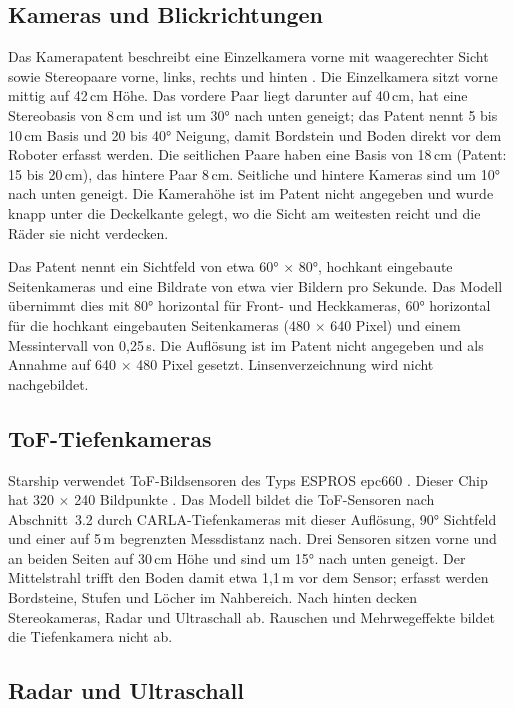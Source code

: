 \subsection{Kameras und Blickrichtungen}
\label{sec:starship_kameras}

Das Kamerapatent beschreibt eine Einzelkamera vorne mit waagerechter Sicht sowie
Stereopaare vorne, links, rechts und hinten \parencite{starship_patent_kamera}. Die
Einzelkamera sitzt vorne mittig auf 42\,cm Höhe. Das vordere Paar liegt darunter auf
40\,cm, hat eine Stereobasis von 8\,cm und ist um 30° nach unten geneigt; das Patent nennt
5 bis 10\,cm Basis und 20 bis 40° Neigung, damit Bordstein und Boden direkt vor dem
Roboter erfasst werden. Die seitlichen Paare haben eine Basis von 18\,cm (Patent: 15 bis
20\,cm), das hintere Paar 8\,cm. Seitliche und hintere Kameras sind um 10° nach unten
geneigt. Die Kamerahöhe ist im Patent nicht angegeben und wurde knapp unter die
Deckelkante gelegt, wo die Sicht am weitesten reicht und die Räder sie nicht verdecken.

Das Patent nennt ein Sichtfeld von etwa 60° $\times$ 80°, hochkant eingebaute
Seitenkameras und eine Bildrate von etwa vier Bildern pro Sekunde. Das Modell übernimmt
dies mit 80° horizontal für Front- und Heckkameras, 60° horizontal für die hochkant
eingebauten Seitenkameras (480 $\times$ 640 Pixel) und einem Messintervall von 0,25\,s.
Die Auflösung ist im Patent nicht angegeben und als Annahme auf 640 $\times$ 480 Pixel
gesetzt. Linsenverzeichnung wird nicht nachgebildet.

\subsection{ToF-Tiefenkameras}
\label{sec:starship_tof}

Starship verwendet ToF-Bildsensoren des Typs ESPROS epc660 \parencite{robot_report_espros}.
Dieser Chip hat 320 $\times$ 240 Bildpunkte \parencite{espros_epc660}. Das Modell bildet
die ToF-Sensoren nach Abschnitt~3.2 durch CARLA-Tiefenkameras mit dieser Auflösung, 90°
Sichtfeld und einer auf 5\,m begrenzten Messdistanz nach. Drei Sensoren sitzen vorne und
an beiden Seiten auf 30\,cm Höhe und sind um 15° nach unten geneigt. Der Mittelstrahl
trifft den Boden damit etwa 1,1\,m vor dem Sensor; erfasst werden Bordsteine, Stufen und
Löcher im Nahbereich. Nach hinten decken Stereokameras, Radar und Ultraschall ab.
Rauschen und Mehrwegeffekte bildet die Tiefenkamera nicht ab.

\subsection{Radar und Ultraschall}
\label{sec:starship_radar_us}

